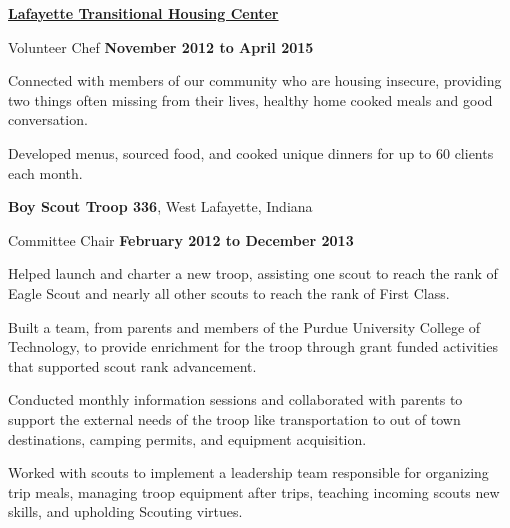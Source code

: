 \documentclass[10pt]{article}
\newcommand{\blankline}{\quad\pagebreak[3]}
\begin{document}
    \href{http://www.lthc.net/}{\textbf{Lafayette Transitional Housing Center}}
    \begin{outerlist}

        \item[] Volunteer Chef %
                \hfill \textbf{November 2012 to April 2015}

                \begin{innerlist}
                    \item Connected with members of our community who are housing insecure,
                          providing two things often missing from their lives, healthy home
                          cooked meals and good conversation.
                    \item Developed menus, sourced food, and cooked unique dinners
                          for up to 60 clients each month.
                \end{innerlist}

    \end{outerlist}

    \blankline

    \textbf{Boy Scout Troop 336}, West Lafayette, Indiana
    \begin{outerlist}

        \item[] Committee Chair %
                \hfill \textbf{February 2012 to December 2013}

                \begin{innerlist}
                    \item Helped launch and charter a new troop, assisting one scout to
                          reach the rank of Eagle Scout and nearly all other scouts to reach
                          the rank of First Class.
                    \item Built a team, from parents and members of the Purdue University
                          College of Technology, to provide enrichment for the troop through
                          grant funded activities that supported scout rank advancement.
                    \item Conducted monthly information sessions and
                          collaborated with parents to support the external
                          needs of the troop like transportation to out of
                          town destinations, camping permits, and equipment
                          acquisition.
                    \item Worked with scouts to implement a leadership team
                          responsible for organizing trip meals, managing troop equipment
                          after trips, teaching incoming scouts new skills, and upholding
                          Scouting virtues.
                \end{innerlist}

    \end{outerlist}
\end{document}
